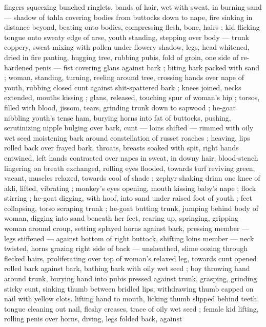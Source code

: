 fingers squeezing bunched ringlets, bands of hair, wet with sweat, in 
burning sand --- shadow of tahla covering bodies from buttocks 
down to nape, fire sinking in distance beyond, beating onto bodies, 
compressing flesh, bone, hairs ; kid flicking tongue onto sweaty edge 
of arse, youth standing, stepping over body --- trunk coppery, sweat 
mixing with pollen under flowery shadow, legs, head whitened, dried 
in fire {\dashcol} panting, hugging tree, rubbing pubis, fold of groin, one 
side of re-hardened penis --- fist covering glans {\dashcol} against bark ; 
biting bark packed with sand ; woman, standing, turning, reeling 
around tree, crossing hands over nape of youth, rubbing closed cunt 
against shit-spattered bark ; knees joined, necks extended, mouths 
kissing ; glans, released, touching spur of woman's hip ; torsos, filled 
with blood, jissom, tears, grinding trunk down to sapwood ; he-goat 
nibbling youth's tense ham, burying horns into fat of buttocks, 
pushing, scrutinizing  nipple bulging over bark, cunt --- loins 
shifted --- rimmed with oily wet seed moistening bark around 
constellation of russet roaches ; heaving, lips rolled back over frayed 
bark, throats, breasts soaked with spit, right hands entwined, left 
hands contracted over napes in sweat, in downy hair, blood-stench 
lingering on breath exchanged, rolling eyes flooded, towards turf 
reviving green, vacant, muscles relaxed, towards cool of shade ; 
zephyr shaking drinn {\col} one knee of akli, lifted, vibrating ; monkey's 
eyes opening, mouth kissing baby's nape ; flock stirring ; he-goat 
digging, with hoof, into sand under raised foot of youth ; feet 
collapsing, torso scraping trunk ; he-goat butting trunk, jumping 
behind body of woman, digging into sand beneath her feet, rearing 
up, springing, gripping woman around croup, setting splayed horns 
against back, pressing member --- legs stiffened --- against bottom 
of right buttock, shifting loins {\col} member --- neck twisted, horns 
grazing right side of back --- unsheathed, slime oozing through 
flecked hairs, proliferating over top of woman's relaxed leg, towards 
cunt opened rolled back against bark, bathing bark with oily wet seed 
; boy throwing hand around trunk, burying hand into pubis pressed 
against trunk, grasping, grinding sticky cunt, sinking thumb between 
bridled lips, withdrawing thumb capped on nail with yellow clots. 
lifting hand to mouth, licking thumb slipped behind teeth, tongue 
cleaning out nail, fleshy creases, trace of oily wet seed ; female kid 
lifting, rolling penis over horns, diving, legs folded back, against 
